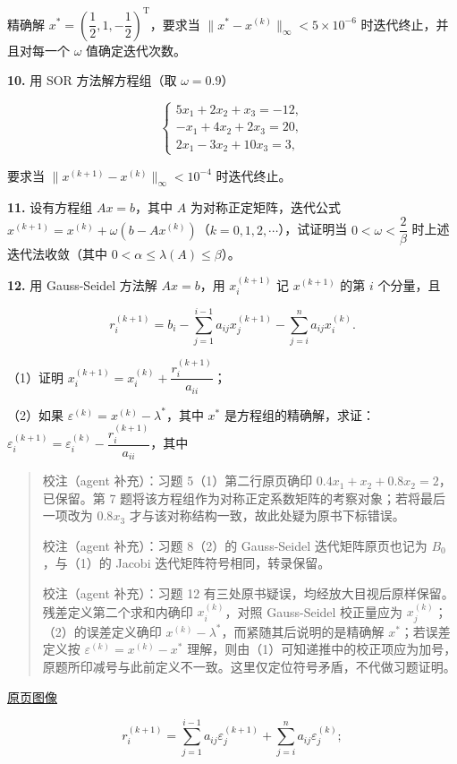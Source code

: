 \documentclass[
  10pt,
  fontset=fandol]{ctexart}
\begin{document}
精确解 \(x^*=\left(\dfrac12,1,-\dfrac12\right)^{\mathrm T}\)，要求当 \(\|x^*-x^{(k)}\|_\infty<5\times10^{-6}\) 时迭代终止，并且对每一个 \(\omega\) 值确定迭代次数。

\textbf{10.} 用 SOR 方法解方程组（取 \(\omega=0.9\)）

\[
\begin{cases}
5x_1+2x_2+x_3=-12,\\
-x_1+4x_2+2x_3=20,\\
2x_1-3x_2+10x_3=3,
\end{cases}
\]

要求当 \(\|x^{(k+1)}-x^{(k)}\|_\infty<10^{-4}\) 时迭代终止。

\textbf{11.} 设有方程组 \(Ax=b\)，其中 \(A\) 为对称正定矩阵，迭代公式 \(x^{(k+1)}=x^{(k)}+\omega(b-Ax^{(k)})\)（\(k=0,1,2,\cdots\)），试证明当 \(0<\omega<\dfrac2\beta\) 时上述迭代法收敛（其中 \(0<\alpha\leqslant\lambda(A)\leqslant\beta\)）。

\textbf{12.} 用 Gauss-Seidel 方法解 \(Ax=b\)，用 \(x_i^{(k+1)}\) 记 \(x^{(k+1)}\) 的第 \(i\) 个分量，且

\[
r_i^{(k+1)}=b_i-\sum_{j=1}^{i-1}a_{ij}x_j^{(k+1)}-\sum_{j=i}^n a_{ij}x_i^{(k)}.
\]

（1）证明 \(x_i^{(k+1)}=x_i^{(k)}+\dfrac{r_i^{(k+1)}}{a_{ii}}\)；

（2）如果 \(\varepsilon^{(k)}=x^{(k)}-\lambda^*\)，其中 \(x^*\) 是方程组的精确解，求证：\(\varepsilon_i^{(k+1)}=\varepsilon_i^{(k)}-\dfrac{r_i^{(k+1)}}{a_{ii}}\)，其中

\begin{quote}
校注（agent 补充）：习题 5（1）第二行原页确印 \(0.4x_1+x_2+0.8x_2=2\)，已保留。第 7 题将该方程组作为对称正定系数矩阵的考察对象；若将最后一项改为 \(0.8x_3\) 才与该对称结构一致，故此处疑为原书下标错误。

校注（agent 补充）：习题 8（2）的 Gauss-Seidel 迭代矩阵原页也记为 \(B_0\)，与（1）的 Jacobi 迭代矩阵符号相同，转录保留。

校注（agent 补充）：习题 12 有三处原书疑误，均经放大目视后原样保留。残差定义第二个求和内确印 \(x_i^{(k)}\)，对照 Gauss-Seidel 校正量应为 \(x_j^{(k)}\)；（2）的误差定义确印 \(x^{(k)}-\lambda^*\)，而紧随其后说明的是精确解 \(x^*\)；若误差定义按 \(\varepsilon^{(k)}=x^{(k)}-x^*\) 理解，则由（1）可知递推中的校正项应为加号，原题所印减号与此前定义不一致。这里仅定位符号矛盾，不代做习题证明。
\end{quote}

\href{../../source-images/pdf-232.jpeg}{原页图像}

\[
r_i^{(k+1)}=\sum_{j=1}^{i-1}a_{ij}\varepsilon_j^{(k+1)}+\sum_{j=i}^n a_{ij}\varepsilon_j^{(k)};
\]
\end{document}
